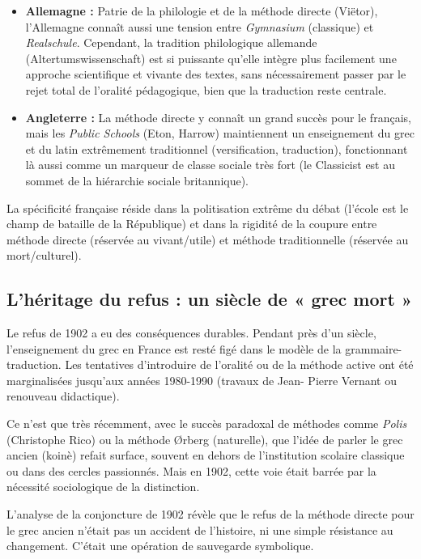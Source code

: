 \begin{itemize}\item \textbf{Allemagne :} Patrie de la philologie et de la méthode directe (Viëtor), l'Allemagne connaît aussi une tension entre \textit{Gymnasium} (classique) et \textit{Realschule}. Cependant, la tradition philologique allemande (Altertumswissenschaft) est si puissante qu'elle intègre plus facilement une approche scientifique et vivante des textes, sans nécessairement passer par le rejet total de l'oralité pédagogique, bien que la traduction reste centrale.\cite{I-2-2-ref6}\item \textbf{Angleterre :} La méthode directe y connaît un grand succès pour le français, mais les \textit{Public Schools} (Eton, Harrow) maintiennent un enseignement du grec et du latin extrêmement traditionnel (versification, traduction), fonctionnant là aussi comme un marqueur de classe sociale très fort (le \og Classicist\fg{} est au sommet de la hiérarchie sociale britannique).\end{itemize}La spécificité française réside dans la politisation extrême du débat (l'école est le champ de
bataille de la République) et dans la rigidité de la coupure entre méthode directe (réservée au
vivant/utile) et méthode traditionnelle (réservée au mort/culturel).



\subsection{L'héritage du refus : un siècle de « grec mort »}

Le refus de 1902 a eu des conséquences durables. Pendant près d'un siècle, l'enseignement du grec en
France est resté figé dans le modèle de la grammaire-traduction. Les tentatives d'introduire de
l'oralité ou de la méthode active ont été marginalisées jusqu'aux années 1980-1990 (travaux de Jean-
Pierre Vernant ou renouveau didactique).\cite{I-2-2-ref31}

Ce n'est que très récemment, avec le succès paradoxal de méthodes comme \textit{Polis} (Christophe
Rico) ou la méthode Ørberg (naturelle), que l'idée de parler le grec ancien (koinè) refait surface,
souvent en dehors de l'institution scolaire classique ou dans des cercles
passionnés.\cite{I-2-2-ref32} Mais en 1902, cette voie était barrée par la nécessité sociologique de
la distinction.

L'analyse de la conjoncture de 1902 révèle que le refus de la méthode directe pour le grec ancien
n'était pas un accident de l'histoire, ni une simple résistance au changement. C'était une opération
de sauvegarde symbolique.

